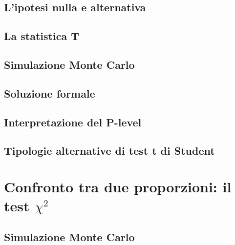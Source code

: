 \documentclass[a4paper,12pt,oneside]{book}
\begin{document}
\hypertarget{lipotesi-nulla-e-alternativa}{%
\subsection{L'ipotesi nulla e alternativa}\label{lipotesi-nulla-e-alternativa}}

\hypertarget{la-statistica-t}{%
\subsection{La statistica T}\label{la-statistica-t}}

\hypertarget{simulazione-monte-carlo}{%
\subsection{Simulazione Monte Carlo}\label{simulazione-monte-carlo}}

\hypertarget{soluzione-formale}{%
\subsection{Soluzione formale}\label{soluzione-formale}}

\hypertarget{interpretazione-del-p-level}{%
\subsection{Interpretazione del P-level}\label{interpretazione-del-p-level}}

\hypertarget{tipologie-alternative-di-test-t-di-student}{%
\subsection{Tipologie alternative di test t di Student}\label{tipologie-alternative-di-test-t-di-student}}

\hypertarget{confronto-tra-due-proporzioni-il-test-chi2}{%
\section{\texorpdfstring{Confronto tra due proporzioni: il test \(\chi^2\)}{Confronto tra due proporzioni: il test \textbackslash chi\^{}2}}\label{confronto-tra-due-proporzioni-il-test-chi2}}

\hypertarget{simulazione-monte-carlo-1}{%
\subsection{Simulazione Monte Carlo}\label{simulazione-monte-carlo-1}}
\end{document}
